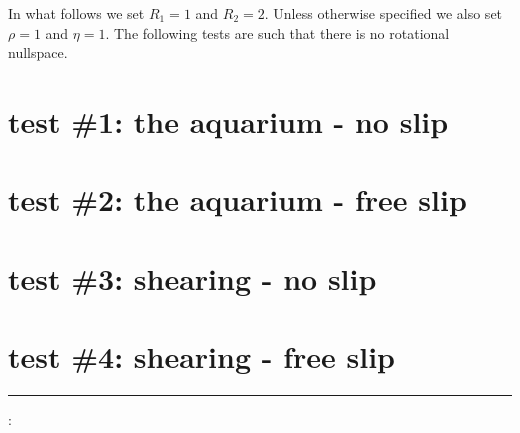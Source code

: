 \newpage

In what follows we set $R_1=1$ and $R_2=2$. Unless otherwise specified we also set $\rho=1$
and $\eta=1$. The following tests are such that there is no rotational nullspace.

\section*{test \#1: the aquarium - no slip}


\section*{test \#2: the aquarium - free slip}


\section*{test \#3: shearing - no slip}


\section*{test \#4: shearing - free slip}








\par\noindent\rule{\textwidth}{0.4pt}

\vspace{.5cm}

\begin{center}
\end{center}

\vspace{.5cm}

\Literature:\\

